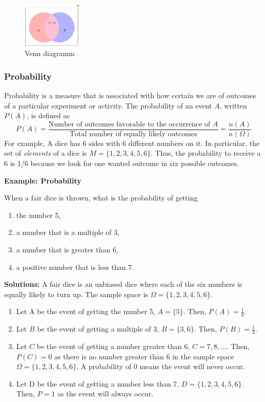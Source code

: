 \documentclass[
  12pt,
  oneside]{book}
\providecommand{\tightlist}{%
  \setlength{\itemsep}{0pt}\setlength{\parskip}{0pt}}
\theoremstyle{definition}
\theoremstyle{definition}
\theoremstyle{definition}
\theoremstyle{definition}
\theoremstyle{remark}
\begin{document}
\begin{figure}
\centering
\includegraphics[width=0.25\textwidth,height=\textheight]{fig/venndia.png}
\caption{\label{fig:venndiagramm} Venn diagramm}
\end{figure}

\subsubsection{Probability}\label{probability}

Probability is a measure that is associated with how certain we are of outcomes of a particular experiment or activity. The probability of an event \(A\), written \(P(A)\), is defined as
\[
P(A)=\frac{\text{Number of outcomes favorable to the occurrence of } A}{\text{Total number of equally likely outcomes}}=\frac{n(A)}{n(\Omega)}
\]
For example, A dice has 6 sides with 6 different numbers on it. In particular, the set of \emph{elements} of a dice is \(M=\{1,2,3,4,5,6\}\). Thus, the probability to receive a 6 is 1/6 because we look for one wanted outcome in six possible outcomes.

\textbf{Example: Probability}

When a fair dice is thrown, what is the probability of getting

\begin{enumerate}
\def\labelenumi{\alph{enumi})}
\tightlist
\item
  the number 5,
\item
  a number that is a multiple of 3,
\item
  a number that is greater than 6,
\item
  a positive number that is less than 7.
\end{enumerate}

\textbf{Solutions:} A fair dice is an unbiased dice where each of the six numbers is equally likely to turn up. The sample space is \(\Omega = \{1, 2, 3, 4, 5, 6\}\).

\begin{enumerate}
\def\labelenumi{\alph{enumi})}
\tightlist
\item
  Let A be the event of getting the number 5, \(A=\{5\}\). Then, \(P(A)=\frac{1}{6}\).
\item
  Let \(B\) be the event of getting a multiple of 3, \(B=\{3, 6\}\). Then, \(P(B)=\frac{1}{3}\).
\item
  Let \(C\) be the event of getting a number greater than 6, \(C=7,8,\dots\). Then, \(P(C)=0\) as there is no number greater than 6 in the sample space \(\Omega=\{1,2,3,4,5,6\}\). A probability of 0 means the event will never occur.
\item
  Let D be the event of getting a number less than 7, \(D=\{1,2,3,4,5,6\}\). Then, \(P=1\) as the event will always occur.
\end{enumerate}
\end{document}
